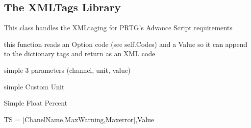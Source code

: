 \documentclass[letterpaper,10pt,english]{sphinxmanual}
\begin{document}
\subsection{The XMLTags Library}
\label{api:module-XMLTags}\label{api:the-xmltags-library}

\begin{fulllineitems}
\label{api:XMLTags.XMLTags}
This class handles the XMLtaging for PRTG's Advance Script
requirements

\begin{fulllineitems}
\label{api:XMLTags.XMLTags.getData}
this function reads an Option code (see self.Codes) and a
Value so it can append to the dictionary  tags and  return
as an XML code

\end{fulllineitems}


\begin{fulllineitems}
\label{api:XMLTags.XMLTags.S3p}
simple 3 parameters (channel, unit, value)

\end{fulllineitems}


\begin{fulllineitems}
\label{api:XMLTags.XMLTags.ScU}
simple Custom Unit

\end{fulllineitems}


\begin{fulllineitems}
\label{api:XMLTags.XMLTags.SFP}
Simple Float Percent

\end{fulllineitems}


\begin{fulllineitems}
\label{api:XMLTags.XMLTags.TblSpcs}
TS = {[}ChanelName,MaxWarning,Maxerror{]},Value

\end{fulllineitems}


\end{fulllineitems}
\end{document}

